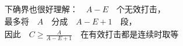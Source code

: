 \documentclass[preview]{standalone}
\begin{document}
\begin{align*}
\text{下确界也很好理解：} \quad A - E \quad \text{个无效打击，} \\ \text{最多将} \quad A \quad \text{分成} \quad A - E + 1 \quad \text{段，} \\ \text{因此} \quad C \geq \frac{A}{A - E + 1} \quad \text{在有效打击都是连续时取等}
\end{align*}
\end{document}
